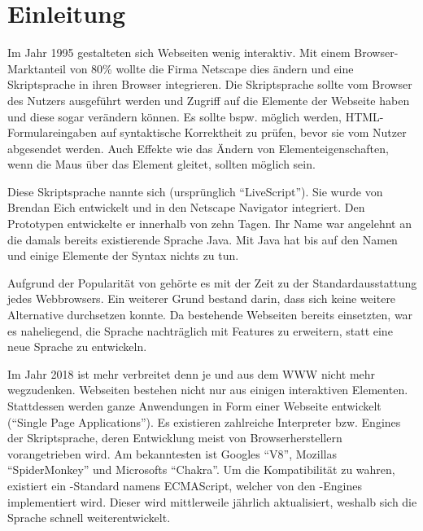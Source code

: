 \documentclass[a4paper]{scrartcl}
\begin{document}
\maketitle

\section{Einleitung}
Im Jahr 1995 gestalteten sich Webseiten wenig interaktiv.
Mit einem Browser-Marktanteil von 80\% wollte die Firma Netscape dies ändern und eine Skriptsprache in ihren Browser integrieren.
Die Skriptsprache sollte vom Browser des Nutzers ausgeführt werden und Zugriff auf die Elemente der Webseite haben und diese sogar verändern können.
Es sollte bspw. möglich werden, HTML-Formulareingaben auf syntaktische Korrektheit zu prüfen, bevor sie vom Nutzer abgesendet werden.
Auch Effekte wie das Ändern von Elementeigenschaften, wenn die Maus über das Element gleitet, sollten möglich sein.

Diese Skriptsprache nannte sich \js{} (ursprünglich \enquote{Live\-Script}).
Sie wurde von Brendan Eich entwickelt und in den Netscape Navigator integriert. %
Den Prototypen entwickelte er innerhalb von zehn Tagen.
Ihr Name war angelehnt an die damals bereits existierende Sprache Java.
Mit Java hat \js{} bis auf den Namen und einige Elemente der Syntax nichts zu tun.

Aufgrund der Popularität von \js{} gehörte es mit der Zeit zu der Standardausstattung jedes Webbrowsers.
Ein weiterer Grund bestand darin, dass sich keine weitere Alternative durchsetzen konnte.
Da bestehende Webseiten bereits \js{} einsetzten, war es naheliegend, die Sprache nachträglich mit Features zu erweitern, statt eine neue Sprache zu entwickeln.

Im Jahr 2018 ist \js{} mehr verbreitet denn je und aus dem WWW nicht mehr wegzudenken.
Webseiten bestehen nicht nur aus einigen interaktiven Elementen.
Stattdessen werden ganze Anwendungen in Form einer Webseite entwickelt (\enquote{Single Page Applications}).
Es existieren zahlreiche Interpreter bzw. Engines der Skriptsprache, deren Entwicklung meist von Browserherstellern vorangetrieben wird.
Am bekanntesten ist Googles \enquote{V8}, Mozillas \enquote{SpiderMonkey} und Microsofts \enquote{Chakra}.
Um die Kompatibilität zu wahren, existiert ein \js-Standard namens ECMAScript, welcher von den \js-Engines implementiert wird.
Dieser wird mittlerweile jährlich aktualisiert, weshalb sich die Sprache schnell weiterentwickelt.
\end{document}
